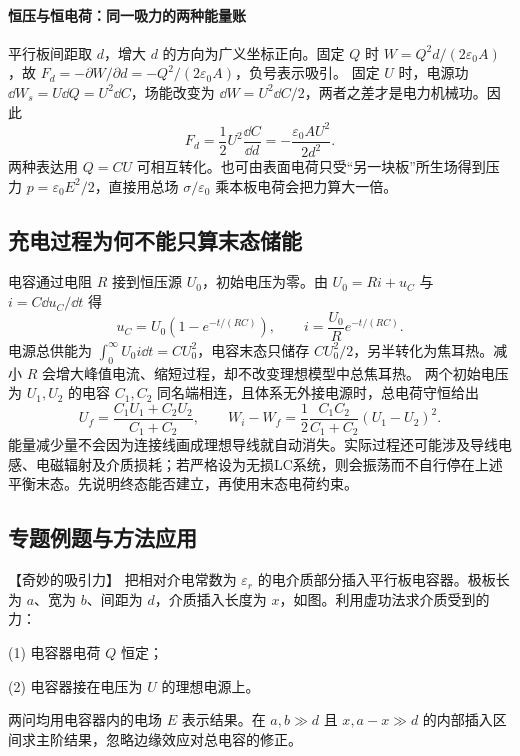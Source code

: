 {%
\paragraph{恒压与恒电荷：同一吸力的两种能量账}
平行板间距取 $d$，增大 $d$ 的方向为广义坐标正向。固定 $Q$ 时
$W=Q^2d/(2\varepsilon_0A)$，故
$F_d=-\partial W/\partial d=-Q^2/(2\varepsilon_0A)$，负号表示吸引。
固定 $U$ 时，电源功 $\dd W_s=U\dd Q=U^2\dd C$，场能改变为 $\dd W=U^2\dd C/2$，两者之差才是电力机械功。因此
\[
 F_d=\frac12U^2\frac{\dd C}{\dd d}
 =-\frac{\varepsilon_0AU^2}{2d^2}.
\]
两种表达用 $Q=CU$ 可相互转化。也可由表面电荷只受“另一块板”所生场得到压力 $p=\varepsilon_0E^2/2$，直接用总场 $\sigma/\varepsilon_0$ 乘本板电荷会把力算大一倍。


\subsection{充电过程为何不能只算末态储能}
电容通过电阻 $R$ 接到恒压源 $U_0$，初始电压为零。由 $U_0=Ri+u_C$ 与 $i=C\dd u_C/\dd t$ 得
\[
 u_C=U_0(1-e^{-t/(RC)}),\qquad i=\frac{U_0}{R}e^{-t/(RC)}.
\]
电源总供能为 $\int_0^\infty U_0i\dd t=CU_0^2$，电容末态只储存 $CU_0^2/2$，另半转化为焦耳热。减小 $R$ 会增大峰值电流、缩短过程，却不改变理想模型中总焦耳热。
两个初始电压为 $U_1,U_2$ 的电容 $C_1,C_2$ 同名端相连，且体系无外接电源时，总电荷守恒给出
\[
 U_f=\frac{C_1U_1+C_2U_2}{C_1+C_2},\qquad
 W_i-W_f=\frac12\frac{C_1C_2}{C_1+C_2}(U_1-U_2)^2.
\]
能量减少量不会因为连接线画成理想导线就自动消失。实际过程还可能涉及导线电感、电磁辐射及介质损耗；若严格设为无损LC系统，则会振荡而不自行停在上述平衡末态。先说明终态能否建立，再使用末态电荷约束。


\subsection{专题例题与方法应用}

\begin{origexamplebox}{【奇妙的吸引力】}\label{ch20:ex:s35-4-5}
把相对介电常数为 $\varepsilon_r$ 的电介质部分插入平行板电容器。极板长为 $a$、宽为 $b$、间距为
$d$，介质插入长度为 $x$，如图。利用虚功法求介质受到的力：

(1) 电容器电荷 $Q$ 恒定；

(2) 电容器接在电压为 $U$ 的理想电源上。

两问均用电容器内的电场 $E$ 表示结果。在 $a,b\gg d$ 且 $x,a-x\gg d$ 的内部插入区间求主阶结果，忽略边缘效应对总电容的修正。
\emInsertionQuestion{}\label{ch20:fig:em-insertion-question}
\end{origexamplebox}\par\nopagebreak[4]

}

